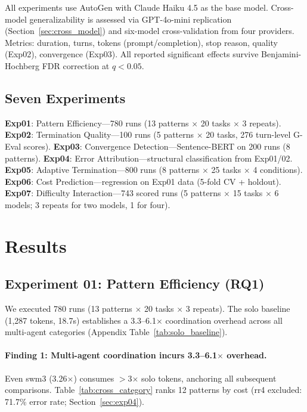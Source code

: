 \documentclass{article}
\begin{document}
All experiments use AutoGen with Claude Haiku 4.5 as the base model. Cross-model generalizability is assessed via GPT-4o-mini replication (Section~\ref{sec:cross_model}) and six-model cross-validation from four providers. Metrics: duration, turns, tokens (prompt/completion), stop reason, quality (Exp02), convergence (Exp03). All reported significant effects survive Benjamini-Hochberg FDR correction \citep{benjamini1995controlling} at $q < 0.05$.

\subsection{Seven Experiments}
\vspace{-1mm}

\textbf{Exp01}: Pattern Efficiency---780 runs (13 patterns $\times$ 20 tasks $\times$ 3 repeats).
\textbf{Exp02}: Termination Quality---100 runs (5 patterns $\times$ 20 tasks, 276 turn-level G-Eval scores).
\textbf{Exp03}: Convergence Detection---Sentence-BERT on 200 runs (8 patterns).
\textbf{Exp04}: Error Attribution---structural classification from Exp01/02.
\textbf{Exp05}: Adaptive Termination---800 runs (8 patterns $\times$ 25 tasks $\times$ 4 conditions).
\textbf{Exp06}: Cost Prediction---regression on Exp01 data (5-fold CV + holdout).
\textbf{Exp07}: Difficulty Interaction---743 scored runs (5 patterns $\times$ 15 tasks $\times$ 6 models; 3 repeats for two models, 1 for four).

\vspace{-1mm}
\section{Results}
\label{sec:results}
\vspace{-1mm}

\subsection{Experiment 01: Pattern Efficiency (RQ1)}
\label{sec:exp01}

We executed 780 runs (13 patterns $\times$ 20 tasks $\times$ 3 repeats). The solo baseline (1,287 tokens, 18.7s) establishes a 3.3--6.1$\times$ coordination overhead across all multi-agent categories (Appendix Table~\ref{tab:solo_baseline}).

\paragraph{Finding 1: Multi-agent coordination incurs 3.3--6.1$\times$ overhead.} Even swm3 (3.26$\times$) consumes $>$3$\times$ solo tokens, anchoring all subsequent comparisons. Table~\ref{tab:cross_category} ranks 12 patterns by cost (rr4 excluded: 71.7\% error rate; Section~\ref{sec:exp04}).
\end{document}
